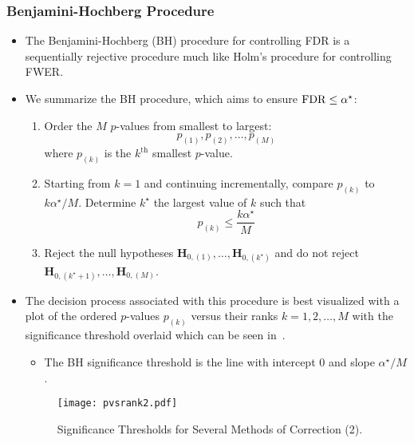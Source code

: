 \subsubsection*{Benjamini-Hochberg Procedure}
\begin{itemize}
      \item The Benjamini-Hochberg (BH) procedure for controlling FDR is a sequentially rejective procedure
            much like Holm's procedure for controlling FWER\@.
      \item We summarize the BH procedure, which aims to ensure $ \operatorname{FDR}\le \alpha^\star $:
            \begin{framed}
                  \begin{enumerate}
                        \item Order the $M$ $p$-values from smallest to largest:
                              \[ p_{(1)},p_{(2)},\ldots,p_{(M)} \]
                              where $ p_{(k)} $ is the $ k^{\text{th}} $ smallest $ p $-value.
                        \item Starting from $ k=1 $ and continuing incrementally, compare
                              $ p_{(k)} $ to $ k\alpha^\star/M $. Determine $ k^\star $
                              the largest value of $ k $ such that
                              \[ p_{(k)}\le \frac{k\alpha^\star}{M}  \]
                        \item Reject the null hypotheses $ \mathbf{H}_{0,(1)},\ldots,\mathbf{H}_{0,(k^\star)} $
                              and do not reject $ \mathbf{H}_{0,(k^\star+1)},\ldots,\mathbf{H}_{0,(M)} $.
                  \end{enumerate}
            \end{framed}
      \item The decision process associated with this procedure is best visualized with a plot of the ordered $p$-values
            $ p_{(k)} $ versus their ranks $ k=1,2,\ldots,M $ with the significance threshold overlaid which can
            be seen in~.
            \begin{itemize}
                  \item The BH significance threshold is the line with intercept $0$ and slope $ \alpha^\star/M $.
            \end{itemize}
            \begin{figure}[!htbp]
                  \centering
                  \texttt{[image: pvsrank2.pdf]}
                  \caption{Significance Thresholds for Several Methods of Correction (2).}\label{fig:pvsrank2}

\end{figure}
\end{itemize}
